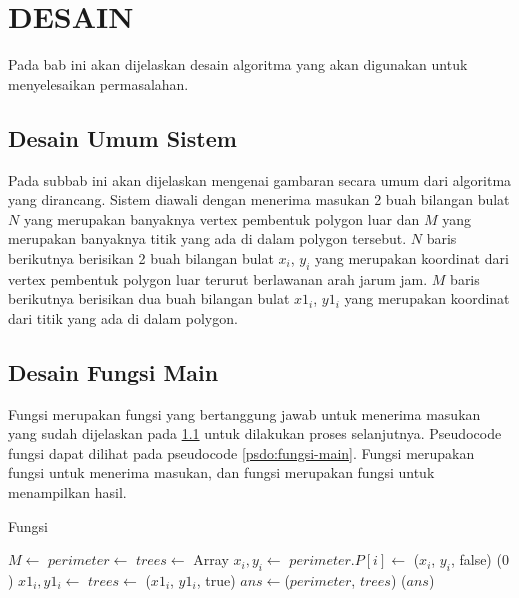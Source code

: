 \chapter{DESAIN}
\label{sec:desain}
Pada bab ini akan dijelaskan desain algoritma yang akan digunakan untuk menyelesaikan permasalahan.

\section{ Desain Umum Sistem}
\label{sec:desain-umum-sistem}
Pada subbab ini akan dijelaskan mengenai gambaran secara umum dari algoritma yang dirancang. Sistem diawali dengan menerima masukan 2 buah bilangan bulat $N$ yang merupakan banyaknya vertex pembentuk polygon luar dan $M$ yang merupakan banyaknya titik yang ada di dalam polygon tersebut. $N$ baris berikutnya berisikan 2 buah bilangan bulat $x_i$, $y_i$ yang merupakan koordinat dari vertex pembentuk polygon luar terurut berlawanan arah jarum jam. $M$ baris berikutnya berisikan dua buah bilangan bulat $x1_i$, $y1_i$ yang merupakan koordinat dari titik yang ada di dalam polygon.

\section{ Desain Fungsi Main}
Fungsi  merupakan fungsi yang bertanggung jawab untuk menerima masukan yang sudah dijelaskan pada \ref{sec:desain-umum-sistem} untuk dilakukan proses selanjutnya. Pseudocode fungsi  dapat dilihat pada pseudocode \ref{psdo:fungsi-main}. Fungsi  merupakan fungsi untuk menerima masukan, dan fungsi  merupakan fungsi untuk menampilkan hasil. 

\begin{algorithm}
	\caption{Fungsi }
	\label{psdo:fungsi-main}
    \begin{algorithmic}[1]
            \State $M \leftarrow$ 
            \State $perimeter \leftarrow$ 
            \State $trees \leftarrow$ Array    
                \State $x_i , y_i \leftarrow $ 
                \State $perimeter.P[i]\leftarrow$ ($x_i$, $y_i$, false)
			\EndFor
				\State {}($0$)
				\State {}
			\EndIf
                \State $ x1_i , y1_i \leftarrow $ 
                \State $trees \leftarrow$ ($x1_i$, $y1_i$, true)
            \EndFor
            \State $ans \leftarrow $($perimeter$, $trees$)
            \State {} ($ans $)
        \EndWhile
	\end{algorithmic}
\end{algorithm}
